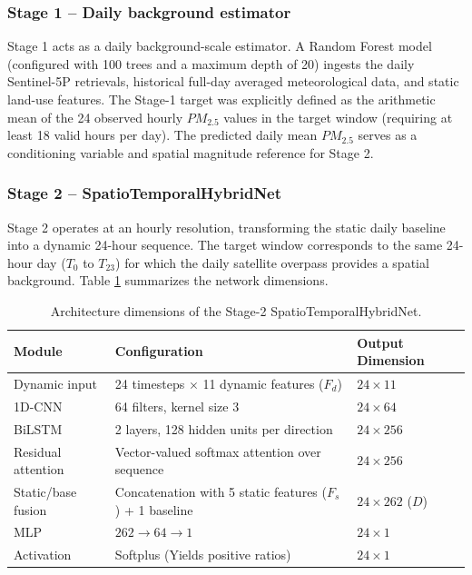 \subsubsection{Stage 1 – Daily background estimator}
Stage 1 acts as a daily background-scale estimator. A Random Forest model (configured with 100 trees and a maximum depth of 20) ingests the daily Sentinel-5P retrievals, historical full-day averaged meteorological data, and static land-use features. The Stage-1 target was explicitly defined as the arithmetic mean of the 24 observed hourly $PM_{2.5}$ values in the target window (requiring at least 18 valid hours per day). The predicted daily mean $PM_{2.5}$ serves as a conditioning variable and spatial magnitude reference for Stage 2.

\subsubsection{Stage 2 – SpatioTemporalHybridNet}
Stage 2 operates at an hourly resolution, transforming the static daily baseline into a dynamic 24-hour sequence. The target window corresponds to the same 24-hour day ($T_0$ to $T_{23}$) for which the daily satellite overpass provides a spatial background. Table \ref{tab:architecture} summarizes the network dimensions.

\begin{table}[h]
\centering
\caption{Architecture dimensions of the Stage-2 SpatioTemporalHybridNet.}
\label{tab:architecture}
\begin{tabular}{lll}
\toprule
\textbf{Module} & \textbf{Configuration} & \textbf{Output Dimension} \\
\midrule
Dynamic input & 24 timesteps $\times$ 11 dynamic features ($F_d$) & $24 \times 11$ \\
1D-CNN & 64 filters, kernel size 3 & $24 \times 64$ \\
BiLSTM & 2 layers, 128 hidden units per direction & $24 \times 256$ \\
Residual attention & Vector-valued softmax attention over sequence & $24 \times 256$ \\
Static/base fusion & Concatenation with 5 static features ($F_s$) + 1 baseline & $24 \times 262$ ($D$) \\
MLP & $262 \rightarrow 64 \rightarrow 1$ & $24 \times 1$ \\
Activation & Softplus (Yields positive ratios) & $24 \times 1$ \\
\bottomrule
\end{tabular}
\end{table}

